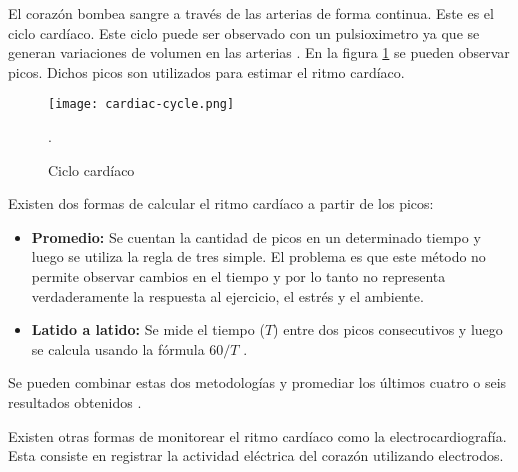 El corazón bombea sangre a través de las arterias de forma continua. Este es el ciclo cardíaco. Este ciclo puede ser observado con un pulsioximetro ya que se generan variaciones de volumen en las arterias \cite{spo2-2}. En la figura \ref{fig:cardiac-cycle} se pueden observar picos. Dichos picos son utilizados para estimar el ritmo cardíaco. 

\begin{figure}[H]
	\centering
    \texttt{[image: cardiac-cycle.png]}
    \caption{Ciclo cardíaco}.
	\label{fig:cardiac-cycle}
\end{figure}

Existen dos formas de calcular el ritmo cardíaco a partir de los picos:

\begin{itemize}
 \item \textbf{Promedio:} Se cuentan la cantidad de picos en un determinado tiempo y luego se utiliza la regla de tres simple. El problema es que este método no permite observar cambios en el tiempo y por lo tanto no representa verdaderamente la respuesta al ejercicio, el estrés y el ambiente.
 \item \textbf{Latido a latido:} Se mide el tiempo ($T$) entre dos picos consecutivos y luego se calcula usando la fórmula $60/T$ \cite{spo2-1}.
\end{itemize}

Se pueden combinar estas dos metodologías y promediar los últimos cuatro o seis resultados obtenidos \cite{spo2-1}.

Existen otras formas de monitorear el ritmo cardíaco como la electrocardiografía. Esta consiste en registrar la actividad eléctrica del corazón utilizando electrodos. 
